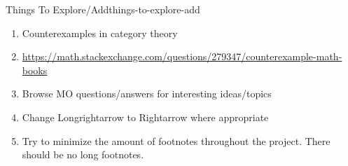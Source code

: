 \begin{remark}{Things To Explore/Add}{things-to-explore-add}
\begin{enumerate}
\begin{enumerate}
                \item \url{https://arxiv.org/abs/1209.5122}
            \end{enumerate}
        \item Counterexamples in category theory
        \item \url{https://math.stackexchange.com/questions/279347/counterexample-math-books}
        \item Browse MO questions/answers for interesting ideas/topics
        \item Change Longrightarrow to Rightarrow where appropriate
        \item Try to minimize the amount of footnotes throughout the project. There should be no long footnotes.
    \end{enumerate}
\end{remark}
\begin{appendices}

\end{appendices}

